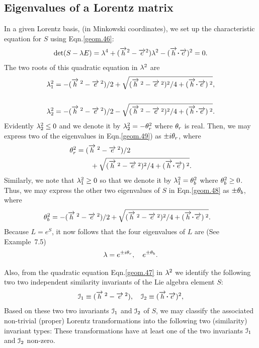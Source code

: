 \subsection{Eigenvalues of a Lorentz matrix} 
In a given Lorentz basis,  (in Minkowski coordinates), 
we set up the characteristic equation for $S$ using  
Eqn.\eqref{geom.46}:
\begin{align}\label{geom.47}
 \det(S-\gkl E)=\gkl^4+(\veca{h}^2-\veca{e}^2)\gkl^2
-(\veca{h}\dotp \veca{e})^2=0.
\end{align}
The two roots of this quadratic equation in ${\lambda}^2$ 
are
\begin{align}\label{geom.48}
\gkl_1^2&=-(\veca{h}{\:^2}-\veca{e}{ \:^2})/2
+\sqrt{(\veca{h}{\:^2}-\veca{e}{\:^2})^2/4
+(\veca{h}\dotp\veca{e}){\:^2}},\\\notag\\ 
\label{geom.49}
\gkl_2^2&=-(\veca{h}{\:^2}-\veca{e}{\:^2})/2-\sqrt{
(\veca{h}{\:^2}
-\veca{e}{\:^2} )^2/4+(\veca{h}\dotp\veca{e}){\:^2}}.
\end{align}
Evidently ${\lambda}_2^2\leq 0$ and we  denote it by 
${\lambda}_2^2=-{\theta}_r^2$  where ${\theta}_r$ is real. Then, we 
may express two of the eigenvalues in 
Eqn.\eqref{geom.49}) as $\pm i{\theta}_r$, where
\begin{align}\label{geom.50}
\gkq_r^2&=(\veca{h}{\:^2}-\veca{e}{\:^2}
)/2\notag\\&\qquad
+\sqrt{ (\veca{h}{\:^2} -\veca{e}{\:^2})^2/4
+(\veca{h}\dotp\veca{e}){\:^2}}.
\end{align}
Similarly, we note that ${\lambda}_1^2\geq 0$ so that we 
denote it by ${\lambda}_1^2={\theta}_b^2 $ where  ${\theta}_b^2\geq 
0$. Thus, we  may express the other two eigenvalues of 
$S$ in Eqn.\eqref{geom.48} as 
$\pm {\theta}_b$, where
\begin{align}\label{geom.51}
\gkq_b^2&=-(\veca{h}{\:^2}-\veca{e}{\:^2})/2
+\sqrt{(\veca{h}{\:^2} -\veca{e}{\:^2})^2/4
+(\veca{h}\dotp\veca{e}){\:^2}}.
\end{align}
Because $L=e^{S}$, it now follows that the four 
eigenvalues of $L$ are (See Example~7.5)
\begin{align}\label{geom.52}
{\lambda}=e^{\pm i{\theta}_r}, \quad  e^{\pm {\theta}_b}.
\end{align}

Also, from the quadratic equation Eqn.\eqref{geom.47} 
in ${\lambda}^2$ we  identify the following two {two 
independent similarity invariants} of the Lie algebra 
element $S$:
\begin{align}\label{geom.53}
\EuScript{I}_1\equiv(\veca{h}{\:^2}-\veca{e}{\:^2}), 
\quad
\EuScript{I}_2\equiv(\veca{h}\dotp\veca{e})^2,
\end{align}
Based on these two  two invariants $\EuScript{I}_1$ 
and 
$\EuScript{I}_2$ of $S$, we may classify the 
associated 
non-trivial (proper) Lorentz transformations into the 
following two (similarity) invariant types: 
These transformations have 
at least one of the two invariants $\EuScript{I}_1$ 
and 
$\EuScript{I}_2$ non-zero. 

